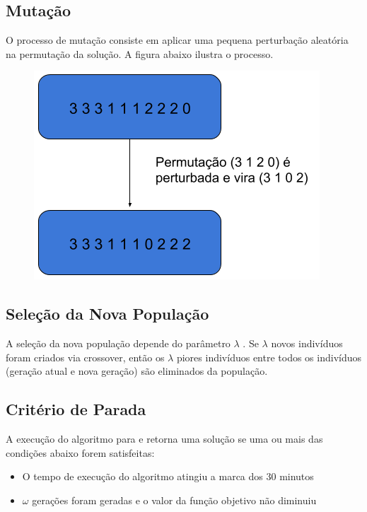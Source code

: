 \documentclass{article}
\begin{document}
\subsection{Mutação}
\quad O processo de mutação consiste em aplicar uma pequena perturbação aleatória na permutação da solução. A figura abaixo ilustra o processo.
\begin{figure}[tph!]
\centering
\includegraphics[scale=0.35]{figure3}
\end{figure}
\subsection{Seleção da Nova População}
\quad A seleção da nova população depende do parâmetro $\lambda$ . Se $\lambda$ novos indivíduos foram criados via crossover, então os $\lambda$ piores indivíduos  entre todos os indivíduos (geração atual e nova geração) são eliminados da população.
\subsection{Critério de Parada}
\quad A execução do algoritmo para e retorna uma solução se uma ou mais das condições abaixo forem satisfeitas:
\begin{itemize}
\item O tempo de execução do algoritmo atingiu a marca dos 30 minutos
\item $\omega$ gerações foram geradas e o valor da função objetivo não diminuiu
\end{itemize}
\end{document}
